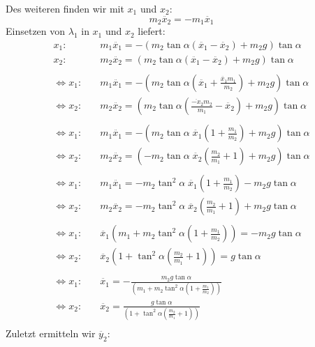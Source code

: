 \documentclass[a4paper,german,12pt,smallheadings]{scrartcl}
\begin{document}
Des weiteren finden wir mit $x_1$ und $x_2$:
\begin{equation}
m_2 \ddot{x_2}=-m_1 \ddot{x_1}
\end{equation}
Einsetzen von $\lambda_1$ in $x_1$ und $x_2$ liefert:
\begin{align*}
x_1: & \quad m_1 \ddot{x_1}=-\left(m_2 \tan \alpha \left(\ddot{x_1}-\ddot{x_2}\right)+m_2g\right) \tan \alpha\\
x_2: & \quad m_2 \ddot{x_2}=\left(m_2 \tan \alpha \left(\ddot{x_1}-\ddot{x_2}\right)+m_2g\right) \tan \alpha\\
\\
\Leftrightarrow x_1: & \quad m_1 \ddot{x_1}=-\left(m_2 \tan \alpha \left(\ddot{x_1}+\frac{\ddot{x_1}m_1}{m_2}\right)+m_2g\right) \tan \alpha\\
\Leftrightarrow x_2: & \quad m_2 \ddot{x_2}=\left(m_2 \tan \alpha \left(\frac{\ddot{-x_2}m_2}{m_1}-\ddot{x_2}\right)+m_2g\right) \tan \alpha\\
\\
\Leftrightarrow x_1: & \quad m_1 \ddot{x_1}=-\left(m_2 \tan \alpha \; \ddot{x_1} \left(1+\frac{m_1}{m_2}\right)+m_2g\right) \tan \alpha\\
\Leftrightarrow x_2: & \quad m_2 \ddot{x_2}=\left(-m_2 \tan \alpha \; \ddot{x_2} \left(\frac{m_2}{m_1}+1\right)+m_2g\right) \tan \alpha\\
\\
\Leftrightarrow x_1: & \quad m_1 \ddot{x_1}=-m_2 \tan^2 \alpha \; \ddot{x_1} \left(1+\frac{m_1}{m_2}\right)-m_2g \tan \alpha\\
\Leftrightarrow x_2: & \quad m_2 \ddot{x_2}=-m_2 \tan^2 \alpha \; \ddot{x_2} \left(\frac{m_2}{m_1}+1\right)+m_2g \tan \alpha\\
\\
\Leftrightarrow x_1: & \quad \ddot{x_1} \left(m_1+m_2 \tan^2 \alpha \left(1+\frac{m_1}{m_2}\right)\right)=-m_2g \tan \alpha\\
\Leftrightarrow x_2: & \quad \ddot{x_2} \left(1+\tan^2 \alpha \left(\frac{m_2}{m_1}+1\right) \right)=g \tan \alpha\\
\\
\Leftrightarrow x_1: & \quad \ddot{x_1}=-\frac{m_2g \tan \alpha}{\left(m_1+m_2 \tan^2 \alpha \left(1+\frac{m_1}{m_2}\right)\right)}\\
\Leftrightarrow x_2: & \quad \ddot{x_2}=\frac{g \tan \alpha}{\left(1+\tan^2 \alpha \left(\frac{m_2}{m_1}+1\right) \right)}\\
\end{align*}
Zuletzt ermitteln wir $\ddot{y_2}$:
\end{document}
